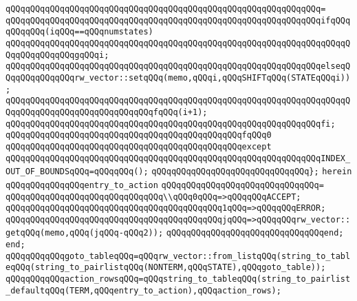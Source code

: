 \verb|qQQqqQQqqQQqqQQqqQQqqQQqqQQqqQQqqQQqqQQqqQQqqQQqqQQqqQQqqQQqqQQq=|\newline
\verb|qQQqqQQqqQQqqQQqqQQqqQQqqQQqqQQqqQQqqQQqqQQqqQQqqQQqqQQqqQQqqQQqifqQQqqQQqqQQq(iqQQq==qQQqnumstates)|\newline
\verb|qQQqqQQqqQQqqQQqqQQqqQQqqQQqqQQqqQQqqQQqqQQqqQQqqQQqqQQqqQQqqQQqqQQqqQQqqQQqqQQqqQQqgqQQqi;|\newline
\verb|qQQqqQQqqQQqqQQqqQQqqQQqqQQqqQQqqQQqqQQqqQQqqQQqqQQqqQQqqQQqqQQqelseqQQqqQQqqQQqqQQqrw_vector::setqQQq(memo,qQQqi,qQQqSHIFTqQQq(STATEqQQqi));|\newline
\verb|qQQqqQQqqQQqqQQqqQQqqQQqqQQqqQQqqQQqqQQqqQQqqQQqqQQqqQQqqQQqqQQqqQQqqQQqqQQqqQQqqQQqqQQqqQQqqQQqqQQqfqQQq(i+1);|\newline
\verb|qQQqqQQqqQQqqQQqqQQqqQQqqQQqqQQqqQQqqQQqqQQqqQQqqQQqqQQqqQQqqQQqfi;|\newline
\newline
\verb|qQQqqQQqqQQqqQQqqQQqqQQqqQQqqQQqqQQqqQQqqQQqqQQqfqQQq0|\newline
\verb|qQQqqQQqqQQqqQQqqQQqqQQqqQQqqQQqqQQqqQQqqQQqqQQqexcept|\newline
\verb|qQQqqQQqqQQqqQQqqQQqqQQqqQQqqQQqqQQqqQQqqQQqqQQqqQQqqQQqqQQqqQQqINDEX_OUT_OF_BOUNDSqQQq=qQQqqQQq();|\newline
\verb|qQQqqQQqqQQqqQQqqQQqqQQqqQQqqQQq};|\newline
\verb|herein|\newline
\verb|qQQqqQQqqQQqqQQqentry_to_action|\newline
\verb|qQQqqQQqqQQqqQQqqQQqqQQqqQQqqQQq=|\newline
\verb|qQQqqQQqqQQqqQQqqQQqqQQqqQQqqQQq\\qQQq0qQQq=>qQQqqQQqACCEPT;|\newline
\verb|qQQqqQQqqQQqqQQqqQQqqQQqqQQqqQQqqQQqqQQqqQQq1qQQq=>qQQqqQQqERROR;|\newline
\verb|qQQqqQQqqQQqqQQqqQQqqQQqqQQqqQQqqQQqqQQqqQQqjqQQq=>qQQqqQQqrw_vector::getqQQq(memo,qQQq(jqQQq-qQQq2));|\newline
\verb|qQQqqQQqqQQqqQQqqQQqqQQqqQQqqQQqend;|\newline
\verb|end;|\newline
\newline
\verb|qQQqqQQqqQQqgoto_tableqQQq=qQQqrw_vector::from_listqQQq(string_to_tableqQQq(string_to_pairlistqQQq(NONTERM,qQQqSTATE),qQQqgoto_table));|\newline
\verb|qQQqqQQqqQQqaction_rowsqQQq=qQQqstring_to_tableqQQq(string_to_pairlist_defaultqQQq(TERM,qQQqentry_to_action),qQQqaction_rows);|\newline
